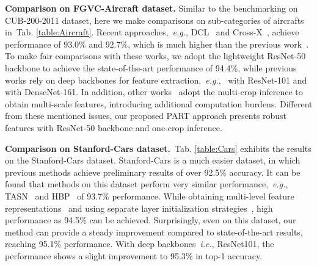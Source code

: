 \documentclass[journal]{IEEEtran}
\def\ie{{\em i.e.}}
\def\eg{{\em e.g.}}
\newcommand{\tabref}[1]{Tab. \ref{#1}}
\begin{document}
\textbf{Comparison on FGVC-Aircraft dataset.} Similar to the benchmarking on CUB-200-2011 dataset, here we make comparisons on sub-categories of aircrafts in~\tabref{table:Aircraft}. Recent approaches,~\eg, DCL~\cite{chen2019destruction} and Cross-X~\cite{luo2019cross}, achieve performance of $93.0\%$ and $92.7\%$, which is much higher than the previous work~\cite{lin2015bilinear}. To make fair comparisons with these works, we adopt the lightweight ResNet-50 backbone to achieve the state-of-the-art performance of 94.4\%, while previous works rely on deep backbones for feature extraction,~\eg,~\cite{gao2020channel} with ResNet-101 and~\cite{dubey2018pairwise,dubey2018maximum} with DenseNet-161. In addition, other works~\cite{fu2017look,zheng2017learning,yang2018learning} adopt the multi-crop inference to obtain multi-scale features, introducing additional computation burdens. Different from these mentioned issues, our proposed PART approach presents robust features with ResNet-50 backbone and one-crop inference.

\textbf{Comparison on Stanford-Cars dataset.}~\tabref{table:Cars} exhibits the results on the Stanford-Cars dataset. Stanford-Cars is a much easier dataset, in which previous methods achieve preliminary results of over 92.5\% accuracy. It can be found that methods on this dataset perform very similar performance,~\eg, TASN~\cite{zheng2019looking} and HBP~\cite{yu2018hierarchical} of 93.7\% performance. While obtaining multi-level feature representations~\cite{luo2019cross} and using separate layer initialization strategies~\cite{wang2018learning}, high performance as 94.5\% can be achieved. Surprisingly, even on this dataset, our method can provide a steady improvement compared to state-of-the-art results, reaching 95.1\% performance. With deep backbones~\ie, ResNet101, the performance shows a slight improvement to 95.3\% in top-1 accuracy.
\end{document}
